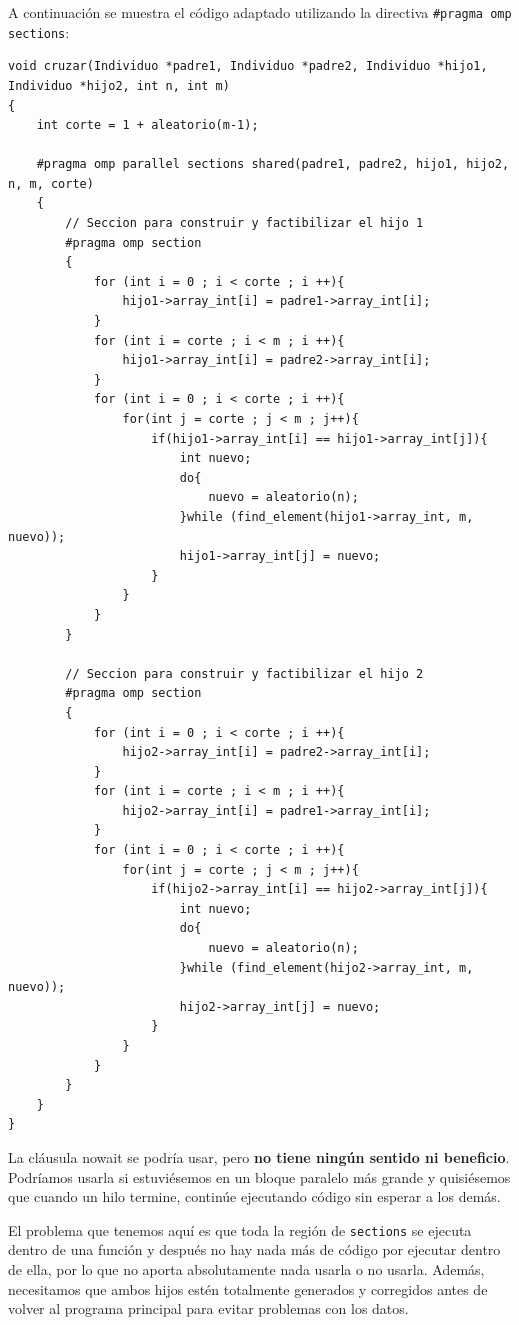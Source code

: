\documentclass[12pt]{article}
\begin{document}
\begin{enumerate}
A continuación se muestra el código adaptado utilizando la directiva \texttt{\#pragma omp sections}:

\begin{lstlisting}[style={EstiloC}]
void cruzar(Individuo *padre1, Individuo *padre2, Individuo *hijo1, Individuo *hijo2, int n, int m)
{
    int corte = 1 + aleatorio(m-1);

    #pragma omp parallel sections shared(padre1, padre2, hijo1, hijo2, n, m, corte)
    {
        // Seccion para construir y factibilizar el hijo 1
        #pragma omp section
        {
            for (int i = 0 ; i < corte ; i ++){
                hijo1->array_int[i] = padre1->array_int[i];
            }
            for (int i = corte ; i < m ; i ++){
                hijo1->array_int[i] = padre2->array_int[i];
            }
            for (int i = 0 ; i < corte ; i ++){
                for(int j = corte ; j < m ; j++){
                    if(hijo1->array_int[i] == hijo1->array_int[j]){
                        int nuevo;
                        do{
                            nuevo = aleatorio(n);
                        }while (find_element(hijo1->array_int, m, nuevo));
                        hijo1->array_int[j] = nuevo;
                    }
                }
            }
        }

        // Seccion para construir y factibilizar el hijo 2
        #pragma omp section
        {
            for (int i = 0 ; i < corte ; i ++){
                hijo2->array_int[i] = padre2->array_int[i];
            }
            for (int i = corte ; i < m ; i ++){
                hijo2->array_int[i] = padre1->array_int[i];
            }
            for (int i = 0 ; i < corte ; i ++){
                for(int j = corte ; j < m ; j++){
                    if(hijo2->array_int[i] == hijo2->array_int[j]){
                        int nuevo;
                        do{
                            nuevo = aleatorio(n);
                        }while (find_element(hijo2->array_int, m, nuevo));
                        hijo2->array_int[j] = nuevo;
                    }
                }
            }
        }
    }
}
\end{lstlisting}


La cláusula nowait se podría usar, pero \textbf{no tiene ningún sentido ni beneficio}. Podríamos usarla si estuviésemos en un bloque paralelo más grande y quisiésemos que cuando un hilo termine, continúe ejecutando código sin esperar a los demás. 

El problema que tenemos aquí es que toda la región de \texttt{sections} se ejecuta dentro de una función y después no hay nada más de código por ejecutar dentro de ella, por lo que no aporta absolutamente nada usarla o no usarla. Además, necesitamos que ambos hijos estén totalmente generados y corregidos antes de volver al programa principal para evitar problemas con los datos.



\end{enumerate}
\end{document}
